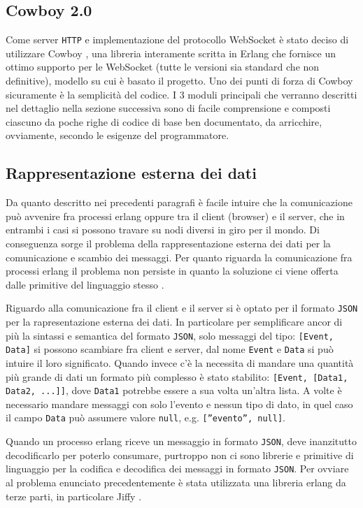 \documentclass[paper=a4, fontsize=11pt]{scrartcl} %
\numberwithin{equation}{section} %
\numberwithin{figure}{section} %
\numberwithin{table}{section} %
\begin{document}
\subsection{Cowboy 2.0}
Come server \texttt{HTTP} e implementazione del protocollo WebSocket  è stato deciso di utilizzare Cowboy \cite{cowboy}, una libreria interamente scritta in Erlang che fornisce un ottimo supporto per le WebSocket (tutte le versioni sia standard che non definitive), modello su cui è basato il progetto.
Uno dei punti di forza di Cowboy sicuramente è la semplicità del codice. I 3 moduli principali che verranno descritti nel dettaglio nella sezione successiva sono di facile comprensione e composti ciascuno da poche righe di codice di base ben documentato, da arricchire, ovviamente, secondo le esigenze del programmatore.

\subsection{Rappresentazione esterna dei dati}
Da quanto descritto nei precedenti paragrafi è facile intuire che la comunicazione può avvenire fra processi erlang oppure tra il client (browser) e il server,
che in entrambi i casi si possono travare su nodi diversi in giro per il mondo. Di conseguenza sorge il problema della rappresentazione esterna dei dati per
la comunicazione e scambio dei messaggi. Per quanto riguarda la comunicazione fra processi erlang il problema non persiste in quanto
la soluzione ci viene offerta dalle primitive del linguaggio stesso \cite{erlang-edr}.

Riguardo alla comunicazione fra il client e il server si è optato per 
il formato \texttt{JSON} per la rapresentazione esterna dei dati. In particolare per semplificare ancor di più la sintassi e semantica del formato \texttt{JSON}, solo
messaggi del tipo: \texttt{[Event, Data]} si possono scambiare fra client e server, dal nome \texttt{Event} e \texttt{Data} si può intuire il loro significato.
Quando invece c'è la necessita di mandare una quantità più grande di dati un formato più complesso è stato stabilito: \texttt{[Event, [Data1, Data2, ...]]}, dove 
\texttt{Data1} potrebbe essere a sua volta un'altra lista. A volte è necessario mandare messaggi con solo l'evento e nessun tipo di dato, in quel caso il campo \texttt{Data} può assumere valore \texttt{null}, e.g. \texttt{[''evento'', null]}.

Quando un processo erlang riceve un messaggio in formato \texttt{JSON}, deve inanzitutto decodificarlo per poterlo consumare, purtroppo non ci sono librerie e primitive di linguaggio
per la codifica e decodifica dei messaggi in formato \texttt{JSON}. Per ovviare al problema enunciato precedentemente è stata utilizzata una libreria erlang da terze parti,
in particolare Jiffy \cite{jiffy}.
\end{document}
